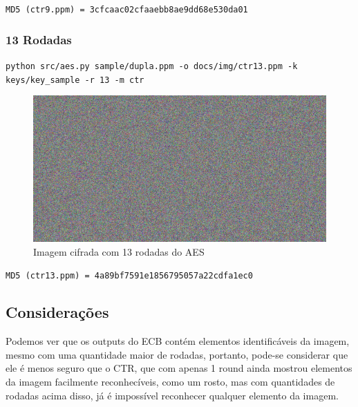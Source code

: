 \documentclass[12pt]{article}
\begin{document}
\noindent \texttt{MD5 (ctr9.ppm) = 3cfcaac02cfaaebb8ae9dd68e530da01}

\subsubsection{13 Rodadas}

\texttt{python src/aes.py sample/dupla.ppm -o docs/img/ctr13.ppm -k keys/key\_sample -r 13 -m ctr}

\begin{figure}[H]
	\centering
    \includegraphics[width=.5\textwidth]{img/ctr13.jpg}
    \caption{Imagem cifrada com 13 rodadas do AES}
\end{figure}

\noindent \texttt{MD5 (ctr13.ppm) = 4a89bf7591e1856795057a22cdfa1ec0}

\subsection{Considerações}
Podemos ver que os outputs do ECB contém elementos identificáveis da imagem, mesmo com uma quantidade maior de rodadas, portanto, pode-se considerar que ele é menos seguro que o CTR, que com apenas 1 round ainda mostrou elementos da imagem facilmente reconhecíveis, como um rosto, mas com quantidades de rodadas acima disso, já é impossível reconhecer qualquer elemento da imagem.
\end{document}

